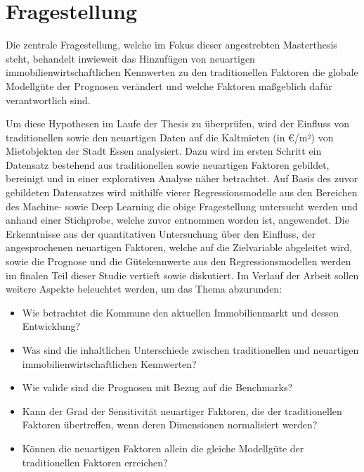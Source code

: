 \section{Fragestellung}
Die zentrale Fragestellung, welche im Fokus dieser angestrebten 
Masterthesis steht, behandelt inwieweit das Hinzufügen von neuartigen 
immobilienwirtschaftlichen Kennwerten zu den traditionellen Faktoren 
die globale Modellgüte der Prognosen verändert und welche Faktoren 
maßgeblich dafür verantwortlich sind.

Um diese Hypothesen im Laufe der Thesis zu überprüfen, wird der 
Einfluss von traditionellen sowie den neuartigen Daten auf die 
Kaltmieten (in €/m²) von Mietobjekten der Stadt Essen analysiert. 
Dazu wird im ersten Schritt ein Datensatz bestehend aus traditionellen 
sowie neuartigen Faktoren gebildet, bereinigt und in einer explorativen 
Analyse näher betrachtet. Auf Basis des zuvor gebildeten Datensatzes 
wird mithilfe vierer Regressionsmodelle aus den Bereichen des Machine- 
sowie Deep Learning die obige Fragestellung untersucht werden und 
anhand einer Stichprobe, welche zuvor entnommen worden ist, angewendet. 
Die Erkenntnisse aus der quantitativen Untersuchung über den Einfluss, 
der angesprochenen neuartigen Faktoren, welche auf die Zielvariable 
abgeleitet wird, sowie die Prognose und die Gütekennwerte aus den 
Regressionsmodellen werden im finalen Teil dieser Studie vertieft 
sowie diskutiert.
\newpage
Im Verlauf der Arbeit sollen weitere Aspekte beleuchtet werden, um das 
Thema abzurunden:

\begin{itemize}
    \item Wie betrachtet die Kommune den aktuellen Immobilienmarkt und dessen Entwicklung?
    \item Was sind die inhaltlichen Unterschiede zwischen traditionellen und neuartigen immobilienwirtschaftlichen Kennwerten?
    \item Wie valide sind die Prognosen mit Bezug auf die Benchmarks?
    \item Kann der Grad der Sensitivität neuartiger Faktoren, die der traditionellen Faktoren übertreffen, wenn deren Dimensionen normalisiert werden?
    \item Können die neuartigen Faktoren allein die gleiche Modellgüte der traditionellen Faktoren erreichen?
\end{itemize}